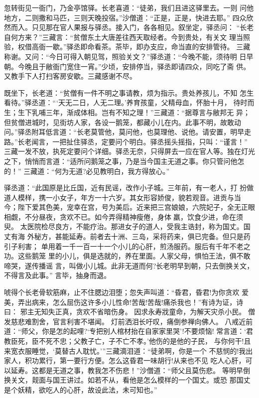 忽转街见一衙门，乃金亭馆驿。长老喜道：“徒弟，我们且进这驿里去。一则
问他地方，二则撒和马匹，三则天晚投宿。”沙僧道：“正是，正是，快进去耶。”
四众欣然而入。只见那在官人果报与驿丞。接入门，各各相见。叙坐定，驿丞问：
“长老自何方来？”三藏言：“贫僧东土大唐差往西天取经者。今到贵处，有关文
理当照验，权借高衙一歇。”驿丞即命看茶。茶毕，即办支应，命当直的安排管待。
三藏称谢。又问：“今日可得入朝见驾，照验关文？”驿丞道：“今晚不能，须待明
日早朝。今晚且于敝衙门宽住一宵。”少顷，安排停当，驿丞即请四众，同吃了斋
供。又教手下人打扫客房安歇。三藏感谢不尽。

既坐下，长老道：“贫僧有一件不明之事请教，烦为指示。贵处养孩儿，不知
怎生看待。”驿丞道：“‘天无二日，人无二理。’养育孩童，父精母血，怀胎十月，
待时而生；生下乳哺三年，渐成体相。岂有不知之理！”三藏道：“据尊言与敝邦无
异；但贫僧进城时，见街坊人家，各设一鹅笼，都藏小儿在内。此事不明，故敢动
问。”驿丞附耳低言道：“长老莫管他，莫问他，也莫理他、说他。请安置，明早走
路。”长老闻言，一把扯住驿丞，定要问个明白。驿丞摇头摇指，只叫：“谨言！”
三藏一发不放，执死定要问个详细。驿丞无奈，只得屏去一应在官人等。独在灯光
之下，悄悄而言道：“适所问鹅笼之事，乃是当今国主无道之事。你只管问他怎的！”
三藏道：“何为无道?必见教明白，我方得放心。”

驿丞道：“此国原是比丘国，近有民谣，改作小子城。三年前，有一老人，打
扮做道人模样，携一小女子，年方一十六岁。其女形容娇俊，貌若观音。进贡与当
今；陛下爱其色美，宠幸在宫，号为美后。近来把三宫娘娘，六院妃子，全无正眼
相觑，不分昼夜，贪欢不已。如今弄得精神瘦倦，身体羸，饮食少进，命在须臾。
太医院检尽良方，不能疗治。那进女子的道人，受我主诰封，称为国丈。国丈有海
外秘方，甚能延寿。前者去十洲、三岛，采将药来，俱已完备。但只是药引子利害；
单用着一千一百一十一个小儿的心肝，煎汤服药。服后有千年不老之功。这些鹅笼
里的小儿，俱是选就的，养在里面。人家父母，惧怕王法，俱不敢啼哭，遂传播谣
言，叫做小儿城。此非无道而何?长老明早到朝，只去倒换关文，不得言及此事。”
言毕，抽身而退。

唬得个长老骨软筋麻，止不住腮边泪堕；忽失声叫道：“昏君，昏君!为你贪欢
爱美，弄出病来，怎么屈伤这许多小儿性命!苦哉!苦哉!痛杀我也！”有诗为证，诗
曰：
邪主无知失正真，贪欢不省暗伤身。
因求永寿戕童命，为解天灾杀小民。
僧发慈悲难割舍，官言利害不堪闻。
灯前洒泪长吁叹，痛倒参禅向佛人。
八戒近前道：“师父，你是怎的起哩?‘专把别人棺材抬在自家家里哭’!不要烦恼!
常言道：‘君教臣死，臣不死不忠；父教子亡，子不亡不孝。’他伤的是他的子民，
与你何干!且来宽衣服睡觉，‘莫替古人耽忧。’”三藏滴泪道：“徒弟啊，你是一个
不慈悯的!我出家人，积功累行，第一要行方便。怎么这昏君一味胡行!从来也不见
吃人心肝，可以延寿。这都是无道之事，教我怎不伤悲！”沙僧道：“师父且莫伤悲。
等明早倒换关文，觌面与国王讲过。如若不从，看他是怎么模样的一个国丈。或恐
那国丈是个妖精，欲吃人的心肝，故设此法，未可知也。”

